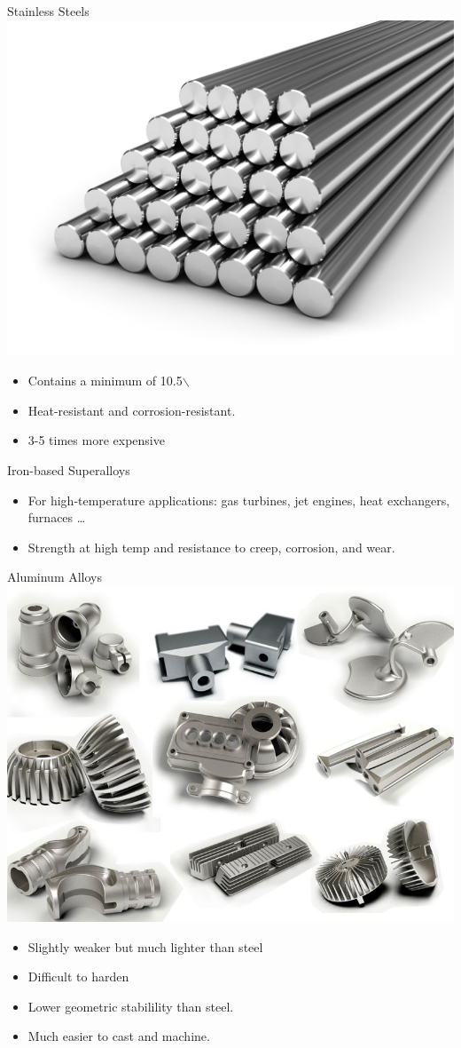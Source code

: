 \documentclass[10pt, svgnames]{beamer}
\begin{document}
\begin{frame}[label={sec:orgeccbc03}]{Stainless Steels}
\centering
\includegraphics[height=0.5\textwidth]{pictures/stainless-steel}

\begin{itemize}
\item Contains a minimum of 10.5$\backslash$%
\item Heat-resistant and corrosion-resistant.
\item 3-5 times more expensive
\end{itemize}
\end{frame}

\begin{frame}[label={sec:org78257f7}]{Iron-based Superalloys}
\begin{itemize}
\item For high-temperature applications: gas turbines, jet engines, heat exchangers, furnaces \ldots{}
\item Strength at high temp and resistance to creep, corrosion, and wear.
\end{itemize}
\end{frame}

\begin{frame}[label={sec:org3cd870d}]{Aluminum Alloys}
\centering
\includegraphics[height=0.4\textwidth]{pictures/aluminium-alloy}

\begin{itemize}
\item Slightly weaker but much lighter than steel
\item Difficult to harden
\item Lower geometric stabilility than steel.
\item Much easier to cast and machine.
\end{itemize}
\end{frame}
\end{document}
